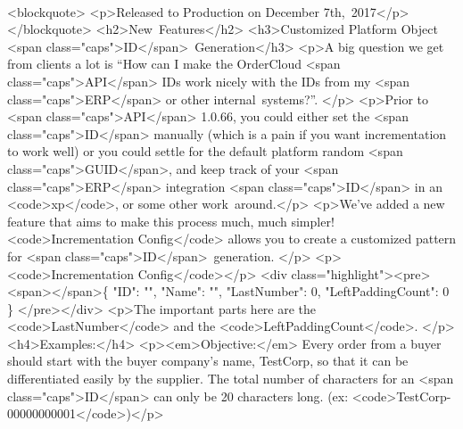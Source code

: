 \documentclass{memoir}%
\begin{document}
\paragraph*{}%
<blockquote>\newline%
<p>Released to Production on December 7th,~2017</p>\newline%
</blockquote>\newline%
<h2>New~Features</h2>\newline%
<h3>Customized Platform Object <span class="caps">ID</span>~Generation</h3>\newline%
<p>A big question we get from clients a lot is “How can I make the OrderCloud <span class="caps">API</span> IDs work nicely with the IDs from my <span class="caps">ERP</span> or other internal~systems?”. </p>\newline%
<p>Prior to <span class="caps">API</span> 1.0.66, you could either set the <span class="caps">ID</span> manually (which is a pain if you want incrementation to work well) or you could settle for the default platform random <span class="caps">GUID</span>, and keep track of your <span class="caps">ERP</span> integration <span class="caps">ID</span> in an <code>xp</code>, or some other work~around.</p>\newline%
<p>We’ve added a new feature that aims to make this process much, much simpler! <code>Incrementation Config</code> allows you to create a customized pattern for <span class="caps">ID</span>~generation. </p>\newline%
<p><code>Incrementation Config</code></p>\newline%
<div class="highlight"><pre><span></span>\{\newline%
  "ID": "",\newline%
  "Name": "",\newline%
  "LastNumber": 0,\newline%
  "LeftPaddingCount": 0\newline%
\}\newline%
</pre></div>\newline%
<p>The important parts here are the <code>LastNumber</code> and the <code>LeftPaddingCount</code>. </p>\newline%
<h4>Examples:</h4>\newline%
<p><em>Objective:</em> Every order from a buyer should start with the buyer company’s name, TestCorp, so that it can be differentiated easily by the supplier. The total number of characters for an <span class="caps">ID</span> can only be 20 characters long. (ex: <code>TestCorp{-}00000000001</code>)</p>\newline%
\end{document}
